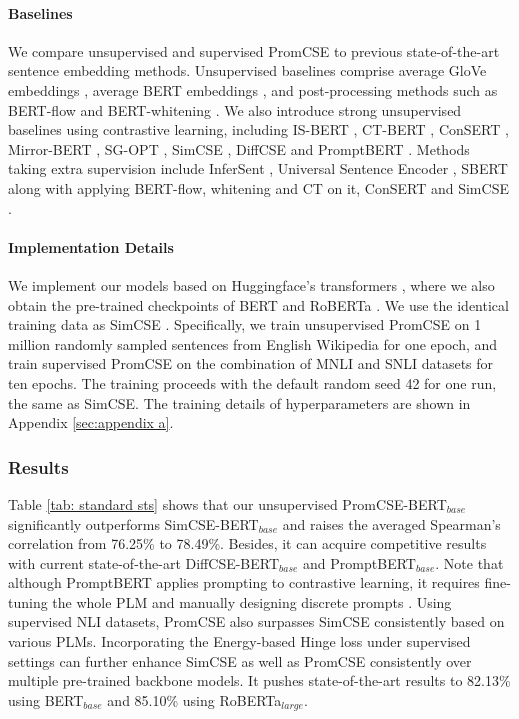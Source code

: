\documentclass[11pt]{article}
\begin{document}
\paragraph{Baselines}
We compare unsupervised and supervised PromCSE to previous state-of-the-art sentence embedding methods. Unsupervised baselines comprise average GloVe embeddings \cite{glove}, average BERT embeddings \cite{gao2021simcse}, and post-processing methods such as BERT-flow \cite{li20bertflow} and BERT-whitening \cite{su2021whitening}. We also introduce strong unsupervised baselines using contrastive learning, including IS-BERT \cite{zhang-etal-2020-isbert}, CT-BERT \cite{carlsson2020ctbert}, ConSERT \cite{Yan2021consert}, Mirror-BERT \cite{liu2021mirrorbert}, SG-OPT \cite{kim2021sgopt}, SimCSE \cite{gao2021simcse}, DiffCSE \cite{chuang2022diffcse} and PromptBERT \cite{2022promptbert}. 
Methods taking extra supervision include InferSent \cite{ConneauKSBB17USE}, Universal Sentence Encoder \cite{CerYKHLJCGYTSK18}, SBERT \cite{ReimersG19sbert} along with applying BERT-flow, whitening and CT on it, ConSERT \cite{Yan2021consert} and SimCSE \cite{gao2021simcse}.
\paragraph{Implementation Details}
We implement our models based on Huggingface’s transformers \cite{huggingface}, where we also obtain the pre-trained checkpoints of BERT \cite{devlin2019bert} and RoBERTa \cite{liu2019roberta}.
We use the identical training data as SimCSE \cite{gao2021simcse}. Specifically, we train unsupervised PromCSE on 1 million randomly sampled sentences from English Wikipedia for one epoch, and train supervised PromCSE on the combination of MNLI \cite{mnli} and SNLI \cite{snli} datasets for ten epochs.
The training proceeds with the default random seed 42 for one run, the same as SimCSE. The training details of hyperparameters are shown in Appendix \ref{sec:appendix a}.


\subsubsection{Results}
Table \ref{tab: standard sts} shows that our unsupervised PromCSE-BERT$_{base}$ significantly outperforms SimCSE-BERT$_{base}$ and raises the averaged Spearman’s correlation from 76.25\% to 78.49\%. Besides, it can acquire competitive results with current state-of-the-art DiffCSE-BERT$_{base}$ and PromptBERT$_{base}$. Note that although PromptBERT applies prompting to contrastive learning, it requires fine-tuning the whole PLM and manually designing discrete prompts \cite{2022promptbert}. 
Using supervised NLI datasets, PromCSE also surpasses SimCSE consistently based on various PLMs.
Incorporating the Energy-based Hinge loss under supervised settings can further enhance SimCSE as well as PromCSE consistently over multiple pre-trained backbone models. It pushes state-of-the-art results to 82.13\% using BERT$_{base}$ and 85.10\% using RoBERTa$_{large}$.
\end{document}
